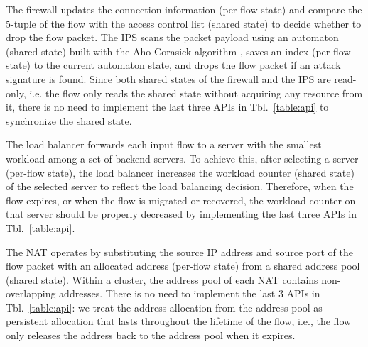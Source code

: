 The firewall
updates the connection information (per-flow state) and compare the 5-tuple of the flow with the access control list (shared state) to decide whether to drop the flow packet. %
The IPS %
scans the packet payload using an automaton (shared state) built with the Aho-Corasick algorithm \cite{aho1975efficient}, saves an index (per-flow state) to the current automaton state, and drops the flow packet if an attack signature is found. %
Since both shared states of the firewall and the IPS are read-only, i.e. the flow only reads the shared state without acquiring any resource from it, there is no need to implement the last three APIs in Tbl.~\ref{table:api} to synchronize the shared state.

The load balancer %
forwards each input flow to a server with the smallest workload among a set of backend servers. To achieve this, after selecting a server (per-flow state), the load balancer increases the workload counter (shared state) of the selected server to reflect the load balancing decision. Therefore, when the flow expires, or when the flow is migrated or recovered, the workload counter on that server should be properly decreased by implementing the last three APIs in Tbl.~\ref{table:api}.

The NAT operates by substituting the source IP address and source port of the flow packet with an allocated address (per-flow state) from a shared address pool (shared state).
Within a cluster, the address pool of each NAT contains non-overlapping addresses.
There is no need to implement the last 3 APIs in Tbl.~\ref{table:api}: we treat the address allocation from the address pool as persistent allocation that lasts throughout the lifetime of the flow, i.e., the flow only releases the address back to the address pool when it expires.%

